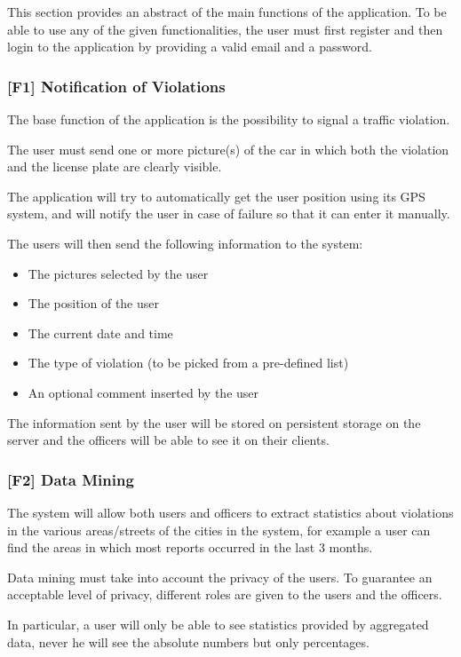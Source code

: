 This section provides an abstract of the main functions of the application. To be able to use any of the given functionalities, the user must first register and then login to the application by providing a valid email and a password.
\subsubsection[Notification of Violations]{[F1] Notification of Violations\hypertarget{sec:f1}{}}
\label{sec:notification_of_violations}
The base function of the application is the possibility to signal a traffic violation.

The user must send one or more picture(s) of the car in which both the violation and the license plate are clearly visible.

The application will try to automatically get the user position using its GPS system, and will notify the user in case of failure so that it can enter it manually.

The users will then send the following information to the system:
\begin{itemize}
    \item The pictures selected by the user
    \item The position of the user
    \item The current date and time
    \item The type of violation (to be picked from a pre-defined list)
    \item An optional comment inserted by the user
\end{itemize}
The information sent by the user will be stored on persistent storage on the server and the officers will be able to see it on their clients.

\subsubsection[Data Mining]{[F2] Data Mining\hypertarget{sec:f2}{}}
The system will allow both users and officers to extract statistics about violations in the various areas/streets of the cities in the system,
for example a user can find the areas in which most reports occurred in the last 3 months.

Data mining must take into account the privacy of the users.
To guarantee an acceptable level of privacy, different roles are given to the users and the officers.

In particular, a user will only be able to see statistics provided by aggregated data, never he will see the absolute numbers but only percentages. 


